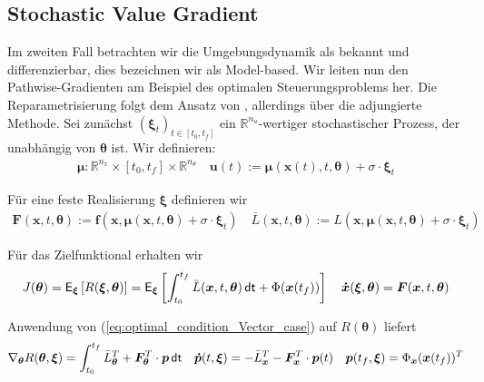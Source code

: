 \documentclass[a4paper, 12pt]{scrartcl}
\newcommand{\dt}{\thinspace \mathsf{dt}}
\begin{document}
\subsection{Stochastic Value Gradient}

Im zweiten Fall betrachten wir die Umgebungsdynamik als bekannt und differenzierbar, 
dies bezeichnen wir als Model-based.
%
Wir leiten nun den Pathwise-Gradienten am Beispiel des optimalen Steuerungsproblems her.
Die Reparametrisierung folgt dem Ansatz von \cite{HessPathwise}, allerdings
über die adjungierte Methode.
Sei zunächst $(\bm{\xi}_t)_{t \in [t_0,t_f]}$ ein $\mathbb{R}^{n_u}$-wertiger
stochastischer Prozess, der unabhängig von $\bm{\theta}$ ist.  
Wir definieren:
%
\begin{align}
    \bm{\mu}:\mathbb{R}^{n_x} \times [t_0, t_f] \times \mathbb{R}^{n_{\theta}}
    \quad
    \bm{u}(t):=
    \bm{\mu}(\bm{x}(t),t, \bm{\theta}) + \sigma \cdot \bm{\xi}_t
    \label{eq:def_reparam_control}
\end{align}

Für eine feste Realisierung $\bm{\xi}$ definieren wir 
%
\begin{align*}
    \bm{F}(\bm{x},t,\bm{\theta})
    :=
    \bm{f}(\bm{x},\bm{\mu}(\bm{x},t, \bm{\theta}) + \sigma \cdot \bm{\xi}_t)
    \quad
    \bar{L}(\bm{x},t,\bm{\theta})
    :=
    L(\bm{x},\bm{\mu}(\bm{x},t, \bm{\theta}) + \sigma \cdot \bm{\xi}_t)
\end{align*}


Für das Zielfunktional erhalten wir
%
\begin{align*}
    J(\bm{\theta})
    =
    \mathsf{E}_{\bm{\xi}}
    \left[
        R(\bm{\xi}, \bm{\theta})
    \right]
    =
    \mathsf{E}_{\bm{\xi}}
    \left[
        \int_{t_0}^{t_f} \bar{L}(\bm{x},t,\bm{\theta}) \dt + \Phi(\bm{x}(t_f))
    \right]
    \quad
    \bm{\dot{x}}(\bm{\xi}, \bm{\theta})
    =
    \bm{F}(\bm{x},t,\bm{\theta})
\end{align*}

Anwendung von (\ref{eq:optimal_condition_Vector_case}) 
auf $R(\bm{\theta})$ liefert
\begin{align*}
    \nabla_{\bm{\theta}}
    R(\bm{\theta}, \bm{\xi})
    =
    \int_{t_0}^{t_f} 
    \bar{L}_{\bm{\theta}}^T + \bm{F}_{\bm{\theta}}^T \cdot \bm{p} \dt
    \quad
    \bm{\dot{p}}(t, \bm{\xi}) =
    -
    \bar{L}_{\bm{x}}^T - \bm{F}_{\bm{x}}^T \cdot \bm{p}(t) 
    \quad
    \bm{p}(t_f, \bm{\xi}) = \Phi_{\bm{x}}(\bm{x}(t_f))^T
\end{align*}
\end{document}
